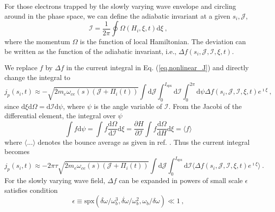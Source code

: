 For those electrons trapped by the slowly varying wave envelope and circling around in the phase space, we can define the adiabatic invariant at a given $s_i,\mathcal{J}$,
\begin{equation}\label{eq.def_I}
    \mathcal{I} = \frac{1}{2\pi} \oint \Omega(H_i,\xi,t) \mathrm{d} \xi~,
\end{equation}
where the momentum $\Omega$ is the function of local Hamiltonian.
The deviation can be written as the function of the adiabatic invariant, i.e., $\Delta f(s_i,\mathcal{J},\mathcal{I},\xi,t)$.

We replace $f$ by $\Delta f$ in the current integral in Eq. (\ref{eq.nonlinear_J}) and directly change the integral to 
\begin{equation}
    j_p(s_i,t) \approx - \sqrt{2m_e\omega_{ce}(s)(\mathcal{J} + \Pi_i(t))}\int\mathrm{d} \mathcal{J} \int_0^{I_{\mathrm{s p x}}}  \mathrm{d}\mathcal{I}  \int_0^{2\pi} \mathrm{d}\psi  \Delta f(s_i,\mathcal{J},\mathcal{I},\xi,t)e^{\imath \xi}  ~,
\end{equation}
since $\mathrm{d}\xi\mathrm{d}\Omega = \mathrm{d}\mathcal{I}\mathrm{d}\psi$, where $\psi$ is the angle variable of $\mathcal{I}$.
From the Jacobi of the differential element, the integral over $\psi$ 
\begin{equation}
      \int f \mathrm{d}\psi = \int f \frac{\mathrm{d}\Omega}{\mathrm{d}\mathcal{I}}\mathrm{d}\xi = \frac{\partial H}{\partial \mathcal{I}}  \int f \frac{\mathrm{d}\Omega}{\mathrm{d} H}\mathrm{d}\xi = \langle f \rangle
\end{equation}
where $\langle ... \rangle$ denotes the bounce average as given in ref. \cite{berk1999}.
Thus the current integral becomes
\begin{equation}
    j_p(s_i,t) \approx -  {2\pi \tau} \sqrt{2m_e\omega_{ce}(s)(\mathcal{J} + \Pi_i(t))}\int\mathrm{d} \mathcal{J} \int_0^{I_{\mathrm{s p x}}}\mathrm{d}\mathcal{I}  \langle \Delta f(s_i,\mathcal{J},\mathcal{I},\xi,t)e^{\imath \xi} \rangle  ~.
\end{equation}
For the slowly varying wave field, $\Delta f$ can be expanded in powers of small scale $\epsilon$ satisfies condition \cite{berk1999}
\begin{equation}
    \epsilon \equiv \mathrm{s p x}\left(\ddot{\delta \omega}/\omega_b^3, \dot{\delta \omega}/\omega_b^2, \omega_b/\delta \omega \right) \ll 1~,
\end{equation}

